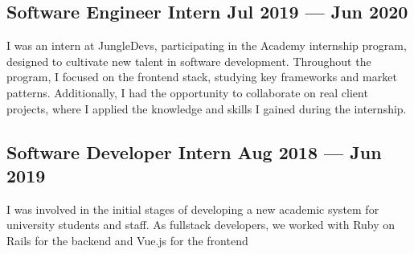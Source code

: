 \documentclass[letter,10pt]{article}
\begin{document}
\subsection{{Software Engineer Intern \hfill Jul 2019 --- Jun 2020}}
\vspace{1mm}
\begin{justify}
I was an intern at JungleDevs, participating in the Academy internship program, designed to cultivate new talent in software development. Throughout the program, I focused on the frontend stack, studying key frameworks and market patterns. Additionally, I had the opportunity to collaborate on real client projects, where I applied the knowledge and skills I gained during the internship.
\end{justify}
\vspace{1mm}

\subsection{{Software Developer Intern \hfill Aug 2018 --- Jun 2019}}
\vspace{1mm}
\begin{justify}
I was involved in the initial stages of developing a new academic system for university students and staff. As fullstack developers, we worked with Ruby on Rails for the backend and Vue.js for the frontend
\end{justify}
\end{document}
